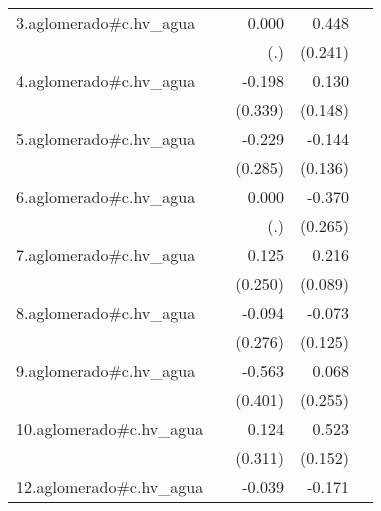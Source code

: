 {\begin{longtable}{l*{4}{D{.}{.}{-1}}}
\addlinespace
3.aglomerado#c.hv\_agua&                     &       0.000         &       0.448         &                     \\
            &                     &         (.)         &     (0.241)         &                     \\
\addlinespace
4.aglomerado#c.hv\_agua&                     &      -0.198         &       0.130         &                     \\
            &                     &     (0.339)         &     (0.148)         &                     \\
\addlinespace
5.aglomerado#c.hv\_agua&                     &      -0.229         &      -0.144         &                     \\
            &                     &     (0.285)         &     (0.136)         &                     \\
\addlinespace
6.aglomerado#c.hv\_agua&                     &       0.000         &      -0.370         &                     \\
            &                     &         (.)         &     (0.265)         &                     \\
\addlinespace
7.aglomerado#c.hv\_agua&                     &       0.125         &       0.216\sym{*}  &                     \\
            &                     &     (0.250)         &     (0.089)         &                     \\
\addlinespace
8.aglomerado#c.hv\_agua&                     &      -0.094         &      -0.073         &                     \\
            &                     &     (0.276)         &     (0.125)         &                     \\
\addlinespace
9.aglomerado#c.hv\_agua&                     &      -0.563         &       0.068         &                     \\
            &                     &     (0.401)         &     (0.255)         &                     \\
\addlinespace
10.aglomerado#c.hv\_agua&                     &       0.124         &       0.523\sym{***}&                     \\
            &                     &     (0.311)         &     (0.152)         &                     \\
\addlinespace
12.aglomerado#c.hv\_agua&                     &      -0.039         &      -0.171         &                     \\

\end{longtable}}
